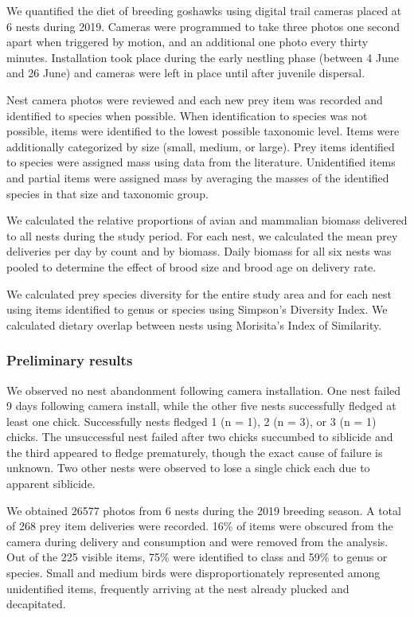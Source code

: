 \documentclass[]{article}
\begin{document}
We quantified the diet of breeding goshawks using digital trail cameras
placed at 6 nests during 2019. Cameras were programmed to take three
photos one second apart when triggered by motion, and an additional one
photo every thirty minutes. Installation took place during the early
nestling phase (between 4 June and 26 June) and cameras were left in
place until after juvenile dispersal.

Nest camera photos were reviewed and each new prey item was recorded and
identified to species when possible. When identification to species was
not possible, items were identified to the lowest possible taxonomic
level. Items were additionally categorized by size (small, medium, or
large). Prey items identified to species were assigned mass using data
from the literature. Unidentified items and partial items were assigned
mass by averaging the masses of the identified species in that size and
taxonomic group.

We calculated the relative proportions of avian and mammalian biomass
delivered to all nests during the study period. For each nest, we
calculated the mean prey deliveries per day by count and by biomass.
Daily biomass for all six nests was pooled to determine the effect of
brood size and brood age on delivery rate.

We calculated prey species diversity for the entire study area and for
each nest using items identified to genus or species using Simpson's
Diversity Index. We calculated dietary overlap between nests using
Morisita's Index of Similarity.

\subsubsection{Preliminary results}\label{preliminary-results-1}

We observed no nest abandonment following camera installation. One nest
failed 9 days following camera install, while the other five nests
successfully fledged at least one chick. Successfully nests fledged 1 (n
= 1), 2 (n = 3), or 3 (n = 1) chicks. The unsuccessful nest failed after
two chicks succumbed to siblicide and the third appeared to fledge
prematurely, though the exact cause of failure is unknown. Two other
nests were observed to lose a single chick each due to apparent
siblicide.

We obtained 26577 photos from 6 nests during the 2019 breeding season. A
total of 268 prey item deliveries were recorded. 16\% of items were
obscured from the camera during delivery and consumption and were
removed from the analysis. Out of the 225 visible items, 75\% were
identified to class and 59\% to genus or species. Small and medium birds
were disproportionately represented among unidentified items, frequently
arriving at the nest already plucked and decapitated.
\end{document}
